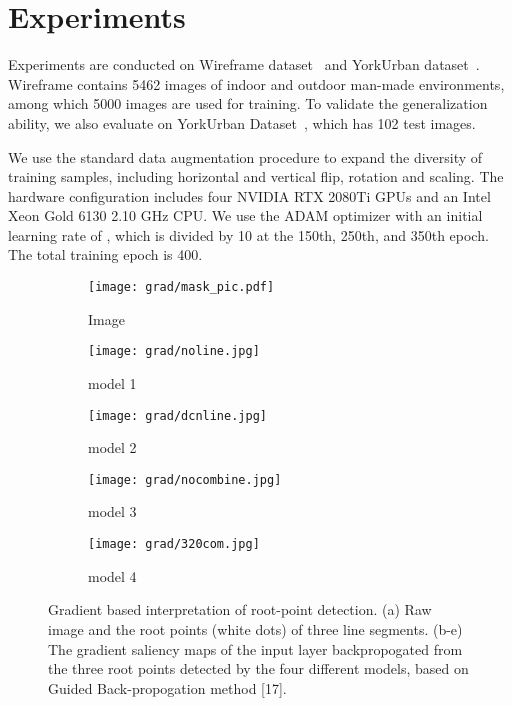 \documentclass[runningheads]{llncs}
\begin{document}
\section{Experiments}

Experiments are conducted on Wireframe dataset~\cite{Wireframe} and YorkUrban dataset~\cite{York}. Wireframe contains 5462 images of indoor and outdoor man-made environments, among which 5000 images are used for training. To validate the generalization ability, we also evaluate on YorkUrban Dataset~\cite{York}, which has 102 test images.

We use the standard data augmentation procedure to expand the diversity of training samples, including horizontal and vertical flip, rotation and scaling.
The hardware configuration includes four NVIDIA RTX 2080Ti GPUs and an Intel Xeon Gold 6130 2.10 GHz CPU. We use the ADAM optimizer with an initial learning rate of , which is divided by 10 at the 150th, 250th, and 350th epoch. The total training epoch is 400.


\begin{figure}[t]
    \begin{center}
     \begin{subfigure}[b]{0.19\textwidth}
         \centering
         \texttt{[image: grad/mask\_pic.pdf]}
         \caption{Image}
         \label{sub_fig:image}
     \end{subfigure}
     \begin{subfigure}[b]{0.19\textwidth}
         \centering
         \texttt{[image: grad/noline.jpg]}
         \caption{model 1}
         \label{sub_fig:noline}
     \end{subfigure}
     \begin{subfigure}[b]{0.19\textwidth}
         \centering
         \texttt{[image: grad/dcnline.jpg]}
         \caption{model 2}
         \label{sub_fig:withline}
     \end{subfigure}
     \begin{subfigure}[b]{0.19\textwidth}
         \centering
         \texttt{[image: grad/nocombine.jpg]}
         \caption{model 3}
         \label{sub_fig:withFAM}
     \end{subfigure}
     \begin{subfigure}[b]{0.19\textwidth}
         \centering
         \texttt{[image: grad/320com.jpg]}
         \caption{model 4}
         \label{sub_fig:withMixConv}
     \end{subfigure}
   \end{center}
    \caption{Gradient based interpretation of root-point detection. (a) Raw image and the root points (white dots) of three line segments. (b-e) The gradient saliency maps of the input layer backpropogated from the three root points detected by the four different models, based on Guided Back-propogation method [17].}
    \label{grad}
\end{figure}
\end{document}
